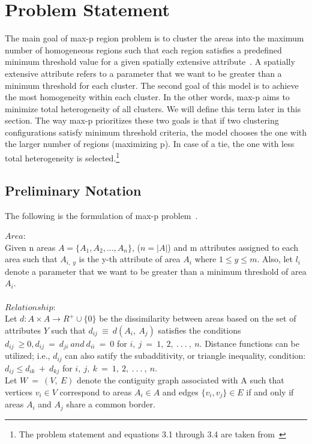 \documentclass[conference]{IEEEtran}
\begin{document}
\section{Problem Statement}
The main goal of max-p region problem is to cluster the areas into the maximum number of
homogeneous regions such that each region satisfies a predefined minimum
threshold value for a given spatially extensive attribute~\cite{r1}. A spatially extensive
attribute refers to a parameter that we want to be greater than a minimum
threshold for each cluster. The second goal of this model is to achieve the most
homogeneity within each cluster. In the other words, max-p aims to minimize total
heterogeneity of all clusters. We will define this term later in this section.
The way max-p prioritizes these two goals is that if two clustering
configurations satisfy minimum threshold criteria, the model chooses the one
with the larger number of regions (maximizing p). In case of a tie, the one with less
total heterogeneity is selected.\footnote{The problem statement and equations 3.1 through 3.4 are taken from~\cite{r1}}

\subsection{Preliminary Notation}
The following is the formulation of max-p problem~\cite{r1}.

$Area:$\\
Given n areas $A = \{A_1, A_2, ..., A_n\}$, ($n = |A|$) and m attributes
assigned to each area such that $A_{i,\;y}$ is the y-th attribute of area $A_i$
where $1 \le y \le m$. Also, let $l_i$ denote a parameter that we want to be greater than a minimum
threshold of area $A_i$.\\ \\ $Relationship:$\\ Let $d : A \times A \rightarrow R^+ \cup
\{0\}$ be the dissimilarity between areas based on the set of attributes $Y$
such that $d_{ij}\ \equiv \ d(A_i,\ A_j)$ satisfies the conditions $d_{ij}\ \geq
0, d_{ij}\ =\ d_{ji}\ and\ d_{ii}\ =\ 0$ for $i,\ j\ =\ 1,\ 2,\ .\ .\ .\ ,\ n.$
Distance functions can be utilized; i.e., $d_{ij}$ can also satify the
subadditivity, or triangle inequality, condition: $d_{ij} \leq d_{ik}\ +\
d_{kj}$ for $i,\ j,\ k\ =\ 1,\ 2,\ .\ .\ .\ ,\ n.$\\ Let $W\ =\ (V,\ E)$ denote
the contiguity graph associated with A such that vertices $v_i \in V$ correspond
to areas $A_i \in A$ and edges $\{v_i, v_j\} \in E$ if and only if areas $A_i$
and $A_j$ share a common border. \\
 
\end{document}
